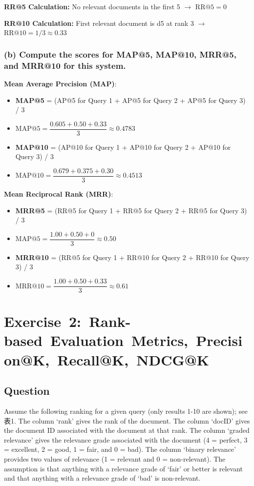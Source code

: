\documentclass[a4paper, utf8]{ctexart}
\begin{document}
	\textbf{RR@5 Calculation:} \quad No relevant documents in the first 5 $\rightarrow$ $\text{RR@5} = 0$
	
	\textbf{RR@10 Calculation:} \quad First relevant document is d5 at rank 3 $\rightarrow$ $\text{RR@10} = 1/3 \approx 0.33$
	
	\subsubsection*{(b) Compute the scores for MAP@5, MAP@10, MRR@5, and MRR@10 for this system.}
	
	\textbf{Mean Average Precision (MAP)}:
	
	\begin{itemize}
	    \item \textbf{MAP@5} = (AP@5 for Query 1 + AP@5 for Query 2 + AP@5 for Query 3) / 3
	    \item[] $\text{MAP@5} = \dfrac{0.605 + 0.50 + 0.33}{3} \approx 0.4783$
	    \item \textbf{MAP@10} = (AP@10 for Query 1 + AP@10 for Query 2 + AP@10 for Query 3) / 3
	    \item[] $\text{MAP@10} = \dfrac{0.679 + 0.375 + 0.30}{3} \approx 0.4513$
	\end{itemize}
	
	\textbf{Mean Reciprocal Rank (MRR)}:
	
	\begin{itemize}
	    \item \textbf{MRR@5} = (RR@5 for Query 1 + RR@5 for Query 2 + RR@5 for Query 3) / 3
	    \item[] $\text{MAP@5}= \dfrac{1.00 + 0.50 + 0}{3} \approx 0.50$
	    \item \textbf{MRR@10} = (RR@5 for Query 1 + RR@10 for Query 2 + RR@10 for Query 3) / 3
	    \item[] $\text{MRR@10} = \dfrac{1.00 + 0.50 + 0.33}{3} \approx 0.61$
	\end{itemize}
	
	\section{Exercise\ 2:\ Rank-based\ Evaluation\ Metrics,\ Precision@K,\ Recall@K,\ NDCG@K}
	
	\subsection{Question}
	
	Assume the following ranking for a given query (only results 1-10 are shown); see 表1. The column ‘rank’ gives the rank of the document. The column ‘docID’ gives the document ID associated with the document at that rank. The column ‘graded relevance’ gives the relevance grade associated with the document (4 = perfect, 3 = excellent, 2 = good, 1 = fair, and 0 = bad). The column ‘binary relevance’ provides two values of relevance (1 = relevant and 0 = non-relevant). The assumption is that anything with a relevance grade of ‘fair’ or better is relevant and that anything with a relevance grade of ‘bad’ is non-relevant. 
	
\end{document}
